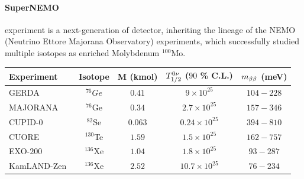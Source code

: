 \paragraph{SuperNEMO} experiment is a next-generation of detector, inheriting the lineage of the NEMO (Neutrino Ettore Majorana Observatory) experiments, which successfully studied multiple isotopes as enriched Molybdenum $^{100}$Mo.



\begin{center}
  \begin{table}
    \begin{tabular}{|l|c|c|c|c|}
      \hline
      Experiment & Isotope & M (kmol)&$T_{1/2}^{0\nu}$ ($90$ \% C.L.)&  $m_{\beta\beta}$ (meV)\\
      \hline \hline
      GERDA~\cite{art:GERDA2019}        & $^{76}Ge$  & $0.41$  & $9\times 10^{25}$          & $104-228$    \\
      MAJORANA~\cite{art:majorana2019}  & $^{76}$Ge  & $0.34$  & $2.7\times 10^{25}$        & $157-346$    \\
      CUPID-$0$~\cite{art:CUPID2018}    & $^{82}$Se  & $0.063$ & $0.24\times 10^{25}$       & $394-810$    \\
      CUORE~\cite{art:CUORE2018}        & $^{130}$Te & $1.59$  & $1.5\times 10^{25}$        & $162-757$    \\
      EXO-$200$~\cite{art:EXO2018}      & $^{136}$Xe & $1.04$  & $1.8\times 10^{25}$        & $93-287$     \\
      KamLAND-Zen~\cite{art:KamLAND2016}& $^{136}$Xe & $2.52$  & $10.7\times 10^{25}$       & $76-234$     \\
      \hline
    \end{tabular}
  \end{table}
\end{center}
